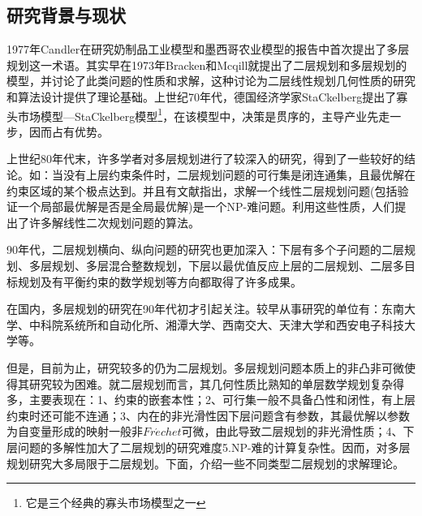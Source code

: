     \subsection{研究背景与现状}
        \par
        1977年Candler在研究奶制品工业模型和墨西哥农业模型的报告中首次提出了多层规划这一术语。其实早在1973年Bracken和Mcqill就提出了二层规划和多层规划的模型，并讨论了此类问题的性质和求解，这种讨论为二层线性规划几何性质的研究和算法设计提供了理论基础。上世纪70年代，德国经济学家StaCkelberg提出了寡头市场模型—StaCkelberg模型\footnote{它是三个经典的寡头市场模型之一}，在该模型中，决策是贯序的，主导产业先走一步，因而占有优势。
        \par
        上世纪80年代末，许多学者对多层规划进行了较深入的研究，得到了一些较好的结论。如：当没有上层约束条件时，二层规划问题的可行集是闭连通集，且最优解在约束区域的某个极点达到。并且有文献指出，求解一个线性二层规划问题(包括验证一个局部最优解是否是全局最优解)是一个NP-难问题。利用这些性质，人们提出了许多解线性二次规划问题的算法。
        \par
        90年代，二层规划横向、纵向问题的研究也更加深入：下层有多个子问题的二层规划、多层规划、多层混合整数规划，下层以最优值反应上层的二层规划、二层多目标规划及有平衡约束的数学规划等方向都取得了许多成果。
        \par
        在国内，多层规划的研究在90年代初才引起关注。较早从事研究的单位有：东南大学、中科院系统所和自动化所、湘潭大学、西南交大、天津大学和西安电子科技大学等。
        \par
        但是，目前为止，研究较多的仍为二层规划。多层规划问题本质上的非凸非可微使得其研究较为困难。就二层规划而言，其几何性质比熟知的单层数学规划复杂得多，主要表现在：1、约束的嵌套本性；2、可行集一般不具备凸性和闭性，有上层约束时还可能不连通；3、内在的非光滑性因下层问题含有参数，其最优解以参数为自变量形成的映射一般非$Fr\acute{e}chet$可微，由此导致二层规划的非光滑性质；4、下层问题的多解性加大了二层规划的研究难度5.NP-难的计算复杂性。因而，对多层规划研究大多局限于二层规划。下面，介绍一些不同类型二层规划的求解理论。
